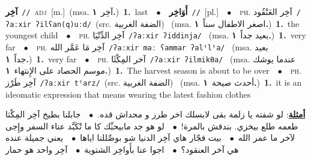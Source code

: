 \documentclass[10pt,a4paper,twoside]{article} %
\begin{document}
\begin{multicols}{2}
{\setlength\topsep{0pt}\textbf{\foreignlanguage{arabic}{آخِر}}\ {\color{gray}\texttt{//}\color{black}}\ \textsc{adj}\ [m.]\ \color{gray}(msa. \foreignlanguage{arabic}{آخِر}~\foreignlanguage{arabic}{\textbf{١.}})\color{black}\ \textbf{1.}~last\ \ $\bullet$\ \ \setlength\topsep{0pt}\textbf{\foreignlanguage{arabic}{أَوَاخِر}}\ {\color{gray}\texttt{//}\color{black}}\ [pl.]\ \ $\bullet$\ \ \textsc{ph.} \color{gray} \foreignlanguage{arabic}{آخِر العَنْقُود}\color{black}\ {\color{gray}\texttt{/{\sffamily ʔaːxir ʔilʕan(q)uːd}/}\color{black}}\ \color{gray}(src. \foreignlanguage{arabic}{الضفة الغربية})\color{black}\ \color{gray} (msa. \foreignlanguage{arabic}{اصغر الاطفال سناً}~\foreignlanguage{arabic}{\textbf{١.}})\color{black}\ \textbf{1.}~the youngest child\ \ $\bullet$\ \ \textsc{ph.} \color{gray} \foreignlanguage{arabic}{آخِر الدِّنْيَا}\color{black}\ {\color{gray}\texttt{/{\sffamily ʔaːxir ʔiddinja}/}\color{black}}\ \color{gray} (msa. \foreignlanguage{arabic}{بعيد جداً}~\foreignlanguage{arabic}{\textbf{١.}})\color{black}\ \textbf{1.}~very far\ \ $\bullet$\ \ \textsc{ph.} \color{gray} \foreignlanguage{arabic}{آخِر مَا عَمَّر الله}\color{black}\ {\color{gray}\texttt{/{\sffamily ʔaːxir maː ʕammar ʔalˤlˤa}/}\color{black}}\ \color{gray} (msa. \foreignlanguage{arabic}{بعيد جداً}~\foreignlanguage{arabic}{\textbf{١.}})\color{black}\ \textbf{1.}~very far\ \ $\bullet$\ \ \textsc{ph.} \color{gray} \foreignlanguage{arabic}{آخر المِكْثَا}\color{black}\ {\color{gray}\texttt{/{\sffamily ʔaːxir ʔilmikθa}/}\color{black}}\ \color{gray} (msa. \foreignlanguage{arabic}{عندما يوشك موسم الحصاد على الإِنتهاء}~\foreignlanguage{arabic}{\textbf{١.}})\color{black}\ \textbf{1.}~The harvest season is about to be over\ \ $\bullet$\ \ \textsc{ph.} \color{gray} \foreignlanguage{arabic}{آخِر طَرْز}\color{black}\ {\color{gray}\texttt{/{\sffamily ʔaːxir tˤarz}/}\color{black}}\ \color{gray}(src. \foreignlanguage{arabic}{الضفة الغربية})\color{black}\ \color{gray} (msa. \foreignlanguage{arabic}{أحدث صيحة}~\foreignlanguage{arabic}{\textbf{١.}})\color{black}\ \textbf{1.}~it is an ideomatic expression that means wearing the latest fashion clothes\  \begin{flushright}\color{gray}\foreignlanguage{arabic}{\textbf{\underline{\foreignlanguage{arabic}{أمثلة}}}: لو شفته يا زلمة بقى لابسلك اخر طرز و محداش قده.\ $\bullet$\ \  جابلنا بطيخ آخِر المِكْثا طعمه طلع بيخزي. بندقش بالمرة!\ $\bullet$\ \  لو هو جد مابيحبِّك كا ما تْكَبَّد عناء السفر وإِجى لآخر ما عمر الله\ $\bullet$\ \  بيت فجّار هاي آخِر الدنيا شو بوصِّللنا اياها\ $\bullet$\ \  يعني جميلة عنده هي آخر العنقود؟\ $\bullet$\ \  اجوا عنا بأَواخِر الشتوية\ $\bullet$\ \  آخِر واحد هو حمار}\end{flushright}\color{black}} \vspace{2mm}


\end{multicols}
\end{document}
